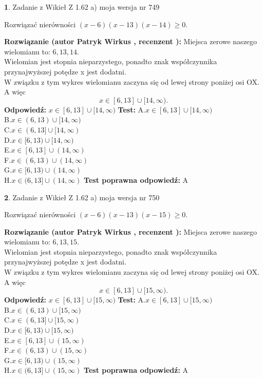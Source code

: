 \documentclass[12pt, a4paper]{article}
\theoremstyle{definition} %
\newtheorem{zad}{}
\newcommand{\zadStart}[1]{\begin{zad}#1\newline}
\newcommand{\zadStop}{\end{zad}}
\newcommand{\rozwStart}[2]{\noindent \textbf{Rozwiązanie (autor #1 , recenzent #2): }\newline}
\newcommand{\rozwStop}{\newline}
\newcommand{\odpStart}{\noindent \textbf{Odpowiedź:}\newline}
\newcommand{\odpStop}{\newline}
\newcommand{\testStart}{\noindent \textbf{Test:}\newline}
\newcommand{\testStop}{\newline}
\newcommand{\kluczStart}{\noindent \textbf{Test poprawna odpowiedź:}\newline}
\newcommand{\kluczStop}{\newline}
\begin{document}
\zadStart{Zadanie z Wikieł Z 1.62 a) moja wersja nr 749}

Rozwiązać nierówności $(x-6)(x-13)(x-14)\ge0$.
\zadStop
\rozwStart{Patryk Wirkus}{}
Miejsca zerowe naszego wielomianu to: $6, 13, 14$.\\
Wielomian jest stopnia nieparzystego, ponadto znak współczynnika przy\linebreak najwyższej potędze x jest dodatni.\\ W związku z tym wykres wielomianu zaczyna się od lewej strony poniżej osi OX. A więc $$x \in [6,13] \cup [14,\infty).$$
\rozwStop
\odpStart
$x \in [6,13] \cup [14,\infty)$
\odpStop
\testStart
A.$x \in [6,13] \cup [14,\infty)$\\
B.$x \in (6,13) \cup [14,\infty)$\\
C.$x \in (6,13] \cup [14,\infty)$\\
D.$x \in [6,13) \cup [14,\infty)$\\
E.$x \in [6,13] \cup (14,\infty)$\\
F.$x \in (6,13) \cup (14,\infty)$\\
G.$x \in [6,13) \cup (14,\infty)$\\
H.$x \in (6,13] \cup (14,\infty)$
\testStop
\kluczStart
A
\kluczStop



\zadStart{Zadanie z Wikieł Z 1.62 a) moja wersja nr 750}

Rozwiązać nierówności $(x-6)(x-13)(x-15)\ge0$.
\zadStop
\rozwStart{Patryk Wirkus}{}
Miejsca zerowe naszego wielomianu to: $6, 13, 15$.\\
Wielomian jest stopnia nieparzystego, ponadto znak współczynnika przy\linebreak najwyższej potędze x jest dodatni.\\ W związku z tym wykres wielomianu zaczyna się od lewej strony poniżej osi OX. A więc $$x \in [6,13] \cup [15,\infty).$$
\rozwStop
\odpStart
$x \in [6,13] \cup [15,\infty)$
\odpStop
\testStart
A.$x \in [6,13] \cup [15,\infty)$\\
B.$x \in (6,13) \cup [15,\infty)$\\
C.$x \in (6,13] \cup [15,\infty)$\\
D.$x \in [6,13) \cup [15,\infty)$\\
E.$x \in [6,13] \cup (15,\infty)$\\
F.$x \in (6,13) \cup (15,\infty)$\\
G.$x \in [6,13) \cup (15,\infty)$\\
H.$x \in (6,13] \cup (15,\infty)$
\testStop
\kluczStart
A
\kluczStop
\end{document}
